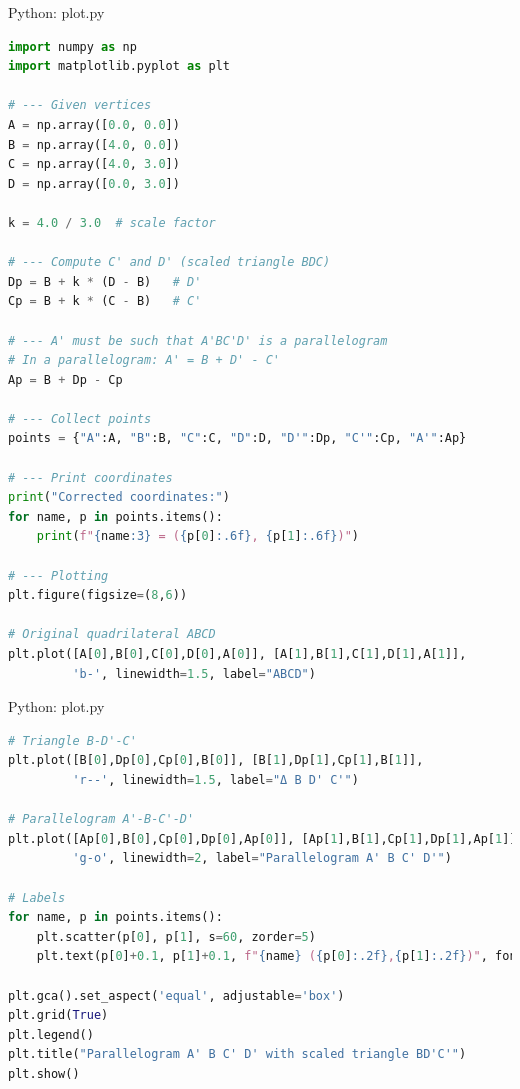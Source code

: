 \documentclass{beamer}
\numberwithin{equation}{section}
\theoremstyle{remark}
\begin{document}
\begin{frame}[fragile]{Python: plot.py}
\begin{lstlisting}[language=Python]
  import numpy as np
import matplotlib.pyplot as plt

# --- Given vertices
A = np.array([0.0, 0.0])
B = np.array([4.0, 0.0])
C = np.array([4.0, 3.0])
D = np.array([0.0, 3.0])

k = 4.0 / 3.0  # scale factor

# --- Compute C' and D' (scaled triangle BDC)
Dp = B + k * (D - B)   # D'
Cp = B + k * (C - B)   # C'

# --- A' must be such that A'BC'D' is a parallelogram
# In a parallelogram: A' = B + D' - C'
Ap = B + Dp - Cp

# --- Collect points
points = {"A":A, "B":B, "C":C, "D":D, "D'":Dp, "C'":Cp, "A'":Ap}

# --- Print coordinates
print("Corrected coordinates:")
for name, p in points.items():
    print(f"{name:3} = ({p[0]:.6f}, {p[1]:.6f})")

# --- Plotting
plt.figure(figsize=(8,6))

# Original quadrilateral ABCD
plt.plot([A[0],B[0],C[0],D[0],A[0]], [A[1],B[1],C[1],D[1],A[1]], 
         'b-', linewidth=1.5, label="ABCD")
\end{lstlisting}
\end{frame} 

\begin{frame}[fragile]{Python: plot.py}
\begin{lstlisting}[language=Python]
# Triangle B-D'-C'
plt.plot([B[0],Dp[0],Cp[0],B[0]], [B[1],Dp[1],Cp[1],B[1]], 
         'r--', linewidth=1.5, label="Δ B D' C'")

# Parallelogram A'-B-C'-D'
plt.plot([Ap[0],B[0],Cp[0],Dp[0],Ap[0]], [Ap[1],B[1],Cp[1],Dp[1],Ap[1]], 
         'g-o', linewidth=2, label="Parallelogram A' B C' D'")

# Labels
for name, p in points.items():
    plt.scatter(p[0], p[1], s=60, zorder=5)
    plt.text(p[0]+0.1, p[1]+0.1, f"{name} ({p[0]:.2f},{p[1]:.2f})", fontsize=9)

plt.gca().set_aspect('equal', adjustable='box')
plt.grid(True)
plt.legend()
plt.title("Parallelogram A' B C' D' with scaled triangle BD'C'")
plt.show()
\end{lstlisting}
\end{frame}
 
\end{document}
